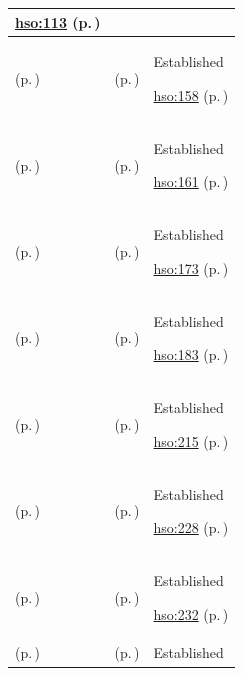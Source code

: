 \begin{longtable}{|>{\raggedright\arraybackslash}p{0.27\TableWidth}|>{\raggedright\arraybackslash}p{0.27\TableWidth}|>{\raggedright\arraybackslash}p{0.46\TableWidth}|}
 \hyperref[rad:hso:106]{hso:113} (p.\,\pageref{rad:hso:106})\\\hline
\nameref{service:bed-availability-query} (p.\,\pageref{service:bed-availability-query}) & \nameref{feature:feat-hso-11} (p.\,\pageref{feature:feat-hso-11}) & Established

 \hyperref[rad:hso:151]{hso:158} (p.\,\pageref{rad:hso:151})\\\hline
\nameref{service:bed-turnover-lifecycle-service} (p.\,\pageref{service:bed-turnover-lifecycle-service}) & \nameref{feature:feat-hso-12} (p.\,\pageref{feature:feat-hso-12}) & Established

 \hyperref[rad:hso:151]{hso:161} (p.\,\pageref{rad:hso:151})\\\hline
\nameref{service:clinical-resource-availability-query} (p.\,\pageref{service:clinical-resource-availability-query}) & \nameref{feature:feat-hso-14} (p.\,\pageref{feature:feat-hso-14}) & Established

 \hyperref[rad:hso:169]{hso:173} (p.\,\pageref{rad:hso:169})\\\hline
\nameref{service:regional-health-system-capacity-query} (p.\,\pageref{service:regional-health-system-capacity-query}) & \nameref{feature:feat-hso-15} (p.\,\pageref{feature:feat-hso-15}) & Established

 \hyperref[rad:hso:179]{hso:183} (p.\,\pageref{rad:hso:179})\\\hline
\nameref{service:on-call-specialist-lookup} (p.\,\pageref{service:on-call-specialist-lookup}) & \nameref{feature:feat-hso-18} (p.\,\pageref{feature:feat-hso-18}) & Established

 \hyperref[rad:hso:211]{hso:215} (p.\,\pageref{rad:hso:211})\\\hline
\nameref{service:work-dispatch-service} (p.\,\pageref{service:work-dispatch-service}) & \nameref{feature:feat-hso-19} (p.\,\pageref{feature:feat-hso-19}) & Established

 \hyperref[rad:hso:221]{hso:228} (p.\,\pageref{rad:hso:221})\\\hline
\nameref{service:operational-work-status-query} (p.\,\pageref{service:operational-work-status-query}) & \nameref{feature:feat-hso-22} (p.\,\pageref{feature:feat-hso-22}) & Established

 \hyperref[rad:hso:221]{hso:232} (p.\,\pageref{rad:hso:221})\\\hline
\nameref{service:patient-transport-tracking-service} (p.\,\pageref{service:patient-transport-tracking-service}) & \nameref{feature:feat-hso-25} (p.\,\pageref{feature:feat-hso-25}) & Established


\end{longtable}
